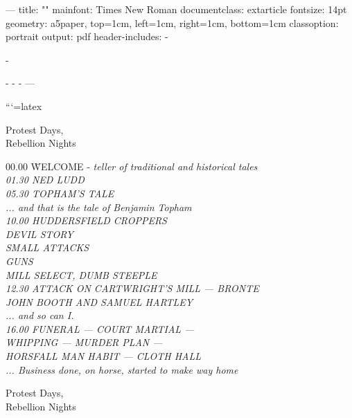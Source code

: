 ---
title: ""
mainfont: Times New Roman
documentclass: extarticle
fontsize: 14pt
geometry: a5paper, top=1cm, left=1cm, right=1cm, bottom=1cm
classoption: portrait
output: pdf
header-includes:
  - \usepackage{fontspec}
  - \usepackage{xcolor}
  - \newfontfamily{}
  - \newfontfamily{} 
  - \pagestyle{empty}
---

```{=latex}
\begin{center}
{\armystencil\fontsize{52pt}{12pt}\selectfont Protest Days,\\Rebellion Nights}

\vspace{3 em}
\end{center}

\begin{tabbing}
00.00 \= WELCOME - \itshape teller of traditional and historical tales 
\\
01.30 \>  NED LUDD
\\
05.30 \> TOPHAM'S TALE \\ \itshape ... and that is the tale of Benjamin Topham
\\
10.00 \> HUDDERSFIELD CROPPERS
\\
\> DEVIL STORY
\\
\> SMALL ATTACKS
\\
\> GUNS 
\\
\> MILL SELECT, DUMB STEEPLE
\\
12.30 \> ATTACK ON CARTWRIGHT'S MILL — BRONTE
\\
\> JOHN BOOTH AND SAMUEL HARTLEY
\\
\> \itshape ... and so can I.
\\
16.00 \> FUNERAL — COURT MARTIAL — 
\\
\> WHIPPING — MURDER PLAN — 
\\
\> HORSFALL MAN HABIT — CLOTH HALL
\\ \> \itshape ... Business done, on horse, started to make way home
\end{tabbing}

\newpage
\begin{center}
{\armystencil\fontsize{52pt}{12pt}\selectfont Protest Days,\\Rebellion Nights}

\vspace{3em}
\end{center}

